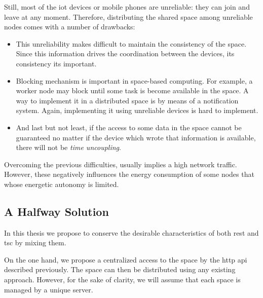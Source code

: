 Still, most of the \ac{iot} devices or mobile phones are unreliable: they can join and leave at any moment.
Therefore, distributing the shared space among unreliable nodes comes with a number of drawbacks:
\begin{itemize}
  \item This unreliability makes difficult to maintain the consistency of the space. %
        Since this information drives the coordination between the devices, its consistency its important.
  \item Blocking mechanism is important in space-based computing.
        For example, a worker node may block until some task is become available in the space.
        A way to implement it in a distributed space is by means of a notification system.
        Again, implementing it using unreliable devices is hard to implement. %
  \item And last but not least, if the access to some data in the space cannot be guaranteed no matter if the device which wrote that information is available, there will not be \emph{time uncoupling}.
\end{itemize}
Overcoming the previous difficulties, usually implies a high network traffic.
However, these negatively influences the energy consumption of some nodes that whose energetic autonomy is limited.


\subsection{A Halfway Solution}
\label{sec:halfway_solution}

In this thesis we propose to conserve the desirable characteristics of both \ac{rest} and \ac{tsc} by mixing them.

On the one hand, we propose a centralized access to the space by the \acs{http} \ac{api} described previously.
The space can then be distributed using any existing approach. %
However, for the sake of clarity, we will assume that each space is managed by a unique server.

